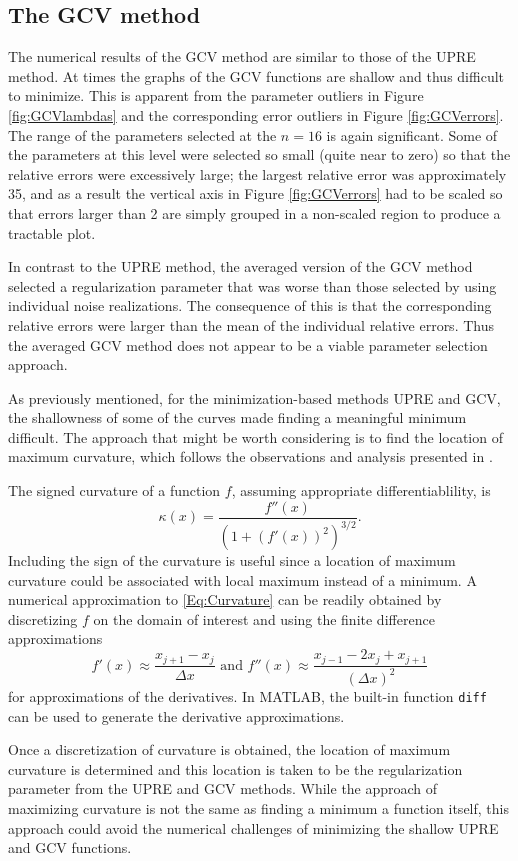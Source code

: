 \documentclass[12pt]{article}
\begin{document}
\subsection{The GCV method} \label{The GCV method}
The numerical results of the GCV method are similar to those of the UPRE method. At times the graphs of the GCV functions are shallow and thus difficult to minimize. This is apparent from the parameter outliers in Figure \ref{fig:GCVlambdas} and the corresponding error outliers in Figure \ref{fig:GCVerrors}. The range of the parameters selected at the $n = 16$ is again significant. Some of the parameters at this level were selected so small (quite near to zero) so that the relative errors were excessively large; the largest relative error was approximately 35, and as a result the vertical axis in Figure \ref{fig:GCVerrors} had to be scaled so that errors larger than 2 are simply grouped in a non-scaled region to produce a tractable plot. \par 
In contrast to the UPRE method, the averaged version of the GCV method selected a regularization parameter that was worse than those selected by using individual noise realizations. The consequence of this is that the corresponding relative errors were larger than the mean of the individual relative errors. Thus the averaged GCV method does not appear to be a viable parameter selection approach. \par 
As previously mentioned, for the minimization-based methods UPRE and GCV, the shallowness of some of the curves made finding a meaningful minimum difficult. The approach that might be worth considering is to find the location of maximum curvature, which follows the observations and analysis presented in \cite{HansenOLeary}. \par 
The signed curvature of a function $f$, assuming appropriate differentiablility, is
\begin{equation}
\kappa(x) = \frac{f''(x)}{(1+(f'(x))^2)^{3/2}}.
\label{Eq:Curvature}
\end{equation}
Including the sign of the curvature is useful since a location of maximum curvature could be associated with local maximum instead of a minimum. A numerical approximation to \eqref{Eq:Curvature} can be readily obtained by discretizing $f$ on the domain of interest and using the finite difference approximations
\[f'(x) \approx \frac{x_{j+1} - x_{j}}{\Delta{x}} \text{ and } f''(x) \approx \frac{x_{j-1} - 2x_j + x_{j+1}}{(\Delta{x})^2}\]
for approximations of the derivatives. In MATLAB, the built-in function \texttt{diff} can be used to generate the derivative approximations. \par 
Once a discretization of curvature is obtained, the location of maximum curvature is determined and this location is taken to be the regularization parameter from the UPRE and GCV methods. While the approach of maximizing curvature is not the same as finding a minimum a function itself, this approach could avoid the numerical challenges of minimizing the shallow UPRE and GCV functions. 
\end{document}

